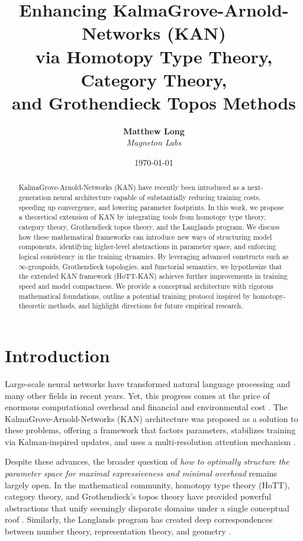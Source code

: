 \documentclass{article}
\title{%
Enhancing KalmaGrove-Arnold-Networks (KAN) \\
via Homotopy Type Theory, Category Theory, \\
and Grothendieck Topos Methods}
\author{
  \textbf{Matthew Long}\\
  \textit{Magneton Labs}
}
\date{\today}
\begin{document}
\maketitle

\begin{abstract}
KalmaGrove-Arnold-Networks (KAN) have recently been introduced as a next-generation neural architecture capable of substantially reducing training costs, speeding up convergence, and lowering parameter footprints. In this work, we propose a theoretical extension of KAN by integrating tools from homotopy type theory, category theory, Grothendieck topos theory, and the Langlands program. We discuss how these mathematical frameworks can introduce new ways of structuring model components, identifying higher-level abstractions in parameter space, and enforcing logical consistency in the training dynamics. By leveraging advanced constructs such as $\infty$-groupoids, Grothendieck topologies, and functorial semantics, we hypothesize that the extended KAN framework (HoTT-KAN) achieves further improvements in training speed and model compactness. We provide a conceptual architecture with rigorous mathematical foundations, outline a potential training protocol inspired by homotopy-theoretic methods, and highlight directions for future empirical research.
\end{abstract}

\section{Introduction}
\label{sec:intro}

Large-scale neural networks have transformed natural language processing and many other fields in recent years. Yet, this progress comes at the price of enormous computational overhead and financial and environmental cost \citep{strubell2019energy}. The KalmaGrove-Arnold-Networks (KAN) architecture was proposed as a solution to these problems, offering a framework that factors parameters, stabilizes training via Kalman-inspired updates, and uses a multi-resolution attention mechanism \citep{KAN2024}.

Despite these advances, the broader question of \emph{how to optimally structure the parameter space for maximal expressiveness and minimal overhead} remains largely open. In the mathematical community, homotopy type theory (HoTT), category theory, and Grothendieck's topos theory have provided powerful abstractions that unify seemingly disparate domains under a single conceptual roof \citep{hottbook, maclane1971categories, grothendieck1972}. Similarly, the Langlands program has created deep correspondences between number theory, representation theory, and geometry \citep{langlands1970problems}.
\end{document}
